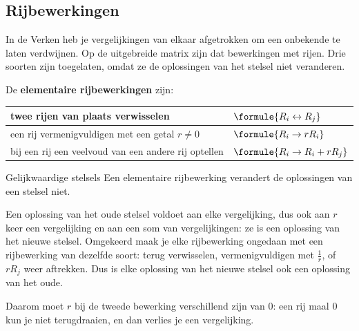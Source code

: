 \subsection{Rijbewerkingen}

In de Verken heb je vergelijkingen van elkaar afgetrokken om een onbekende te laten verdwijnen. Op de uitgebreide matrix zijn dat bewerkingen met rijen. Drie soorten zijn toegelaten, omdat ze de oplossingen van het stelsel niet veranderen.

\begin{theorie}
De \textbf{\textcolor{accent}{elementaire rijbewerkingen}} zijn:

\vspace{1mm}
{\centering{}\renewcommand{\arraystretch}{1.5}%
\begin{tabular}{|>{\centering\arraybackslash}m{6.6cm}|>{\centering\arraybackslash}m{3.6cm}|}
\hline
twee rijen van plaats verwisselen & $\formule{R_i \leftrightarrow R_j}$ \\ \hline
een rij vermenigvuldigen met een getal $r \neq 0$ & $\formule{R_i \to rR_i}$ \\ \hline
bij een rij een veelvoud van een andere rij optellen & $\formule{R_i \to R_i + rR_j}$ \\ \hline
\end{tabular}\par}

\begin{stelling}{Gelijkwaardige stelsels}
Een elementaire rijbewerking verandert de oplossingen van een stelsel niet.
\end{stelling}

\begin{bewijs}
Een oplossing van het oude stelsel voldoet aan elke vergelijking, dus ook aan $r$ keer een vergelijking en aan een som van vergelijkingen: ze is een oplossing van het nieuwe stelsel. Omgekeerd maak je elke rijbewerking ongedaan met een rijbewerking van dezelfde soort: terug verwisselen, vermenigvuldigen met $\frac1r$, of $rR_j$ weer aftrekken. Dus is elke oplossing van het nieuwe stelsel ook een oplossing van het oude.
\end{bewijs}
\end{theorie}

Daarom moet $r$ bij de tweede bewerking verschillend zijn van 0: een rij maal 0 kun je niet terugdraaien, en dan verlies je een vergelijking.

\begin{oefeningen}
\end{oefeningen}

